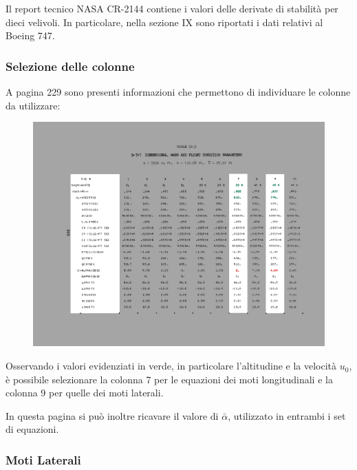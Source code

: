 Il report tecnico NASA CR-2144 \cite{heffley_handling_qualities} contiene i valori delle derivate di stabilità per dieci velivoli. In particolare, nella sezione IX sono riportati i dati relativi al Boeing 747.

\subsubsection*{Selezione delle colonne}

A pagina 229 sono presenti informazioni che permettono di individuare le colonne da utilizzare:

\begin{figure}[H]
    \centering
    \includegraphics[width=1\linewidth]{Immagini/229.jpg}
\end{figure}

Osservando i valori evidenziati in verde, in particolare l'altitudine e la velocità $u_0$, è possibile selezionare la colonna 7 per le equazioni dei moti longitudinali e la colonna 9 per quelle dei moti laterali.

In questa pagina si può inoltre ricavare il valore di $\bar{\alpha}$, utilizzato in entrambi i set di equazioni.

\subsubsection*{Moti Laterali}

